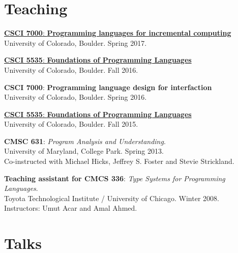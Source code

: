 \documentclass[10pt,letterpaper]{article}
\renewenvironment{itemize}{
  \begin{list}{}{
    \setlength{\leftmargin}{1.5em}
    \setlength{\itemsep}{0.25em}
    \setlength{\parskip}{0pt}
    \setlength{\parsep}{0.25em}
  }
}{
  \end{list}
}
\begin{document}
\section*{Teaching}

\begin{itemize}

\item {
  \href{http://matthewhammer.org/courses/csci7000-s17}
  {\textbf{CSCI 7000}: \textbf{Programming languages for incremental computing}}
  \\
  University of Colorado, Boulder.  Spring 2017.  
}

\item {
  \href{http://matthewhammer.org/courses/csci5535-f16}
  {\textbf{CSCI 5535}: \textbf{Foundations of Programming Languages}}
  \\
  University of Colorado, Boulder.  Fall 2016. 
}

\item {
  \textbf{CSCI 7000}: \textbf{Programming language design for interfaction}
  \\
  University of Colorado, Boulder.  Spring 2016.  
}

\item {
  \href{https://www.cs.colorado.edu/~maha2973/csci5535/f15/}
  {\textbf{CSCI 5535}: \textbf{Foundations of Programming Languages}}
  \\
  University of Colorado, Boulder.  Fall 2015.  
}

  
\item {
  \textbf{CMSC 631}: \textit{Program Analysis and Understanding}.
  \\
  University of Maryland, College Park.  Spring 2013.
  \\
  Co-instructed with Michael Hicks, Jeffrey S. Foster and Stevie Strickland.
}

\item { 
  \textbf{Teaching assistant for CMCS 336}: \textit{Type Systems for Programming Languages}.
  \\
  Toyota Technological Institute / University of Chicago.  Winter 2008.
  \\
  Instructors: Umut Acar and Amal Ahmed.
}
\end{itemize}


\section*{Talks}
\end{document}
